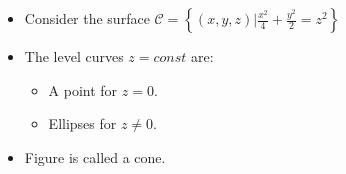 \begin{frame}
\begin{columns}
\begin{itemize}
\item Consider the surface 
$\mathcal C =\left\{(x,y,z) |\frac{x^2}{4}+\frac{y^2}{2}=z^2 \right\}$ 
\item<2-> The level curves $z=const$ are:
\begin{itemize}
\item<4-> A point for $z=0$.
\item<6-> Ellipses for $z\neq 0$.
\end{itemize}

\item<9-> Figure is called a cone.
\end{itemize}

\end{columns}

\vskip 10cm

\end{frame}